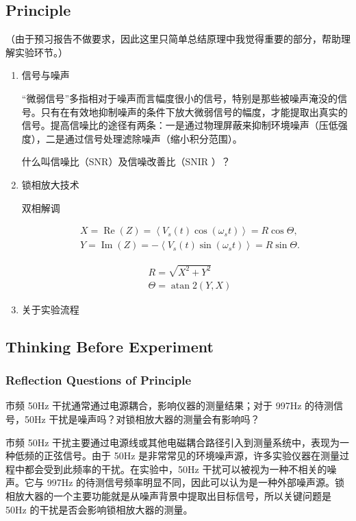 \subsection{Principle}
（由于预习报告不做要求，因此这里只简单总结原理中我觉得重要的部分，帮助理解实验环节。）
\begin{enumerate}
	\item 信号与噪声
	
	“微弱信号”多指相对于噪声而言幅度很小的信号，特别是那些被噪声淹没的信号。只有在有效地抑制噪声的条件下放大微弱信号的幅度，才能提取出真实的信号。提高信噪比的途径有两条：一是通过物理屏蔽来抑制环境噪声（压低强度），二是通过信号处理滤除噪声（缩小积分范围）。
	
	什么叫信噪比（SNR）及信噪改善比（SNIR ）？  
	
	\item 锁相放大技术
	
	双相解调
	
	$$
	\begin{aligned}
		& X=\operatorname{Re}(Z)=\left\langle V_s(t) \cos \left(\omega_s t\right)\right\rangle=R \cos \Theta, \\
		& Y=\operatorname{Im}(Z)=-\left\langle V_s(t) \sin \left(\omega_s t\right)\right\rangle=R \sin \Theta .
	\end{aligned}
	$$
	
	$$
	\begin{aligned}
		& R=\sqrt{X^2+Y^2} \\
		& \Theta=\operatorname{atan} 2(Y, X)
	\end{aligned}
	$$
	
	\item 关于实验流程
\end{enumerate}


\subsection{Thinking Before Experiment}

\subsubsection{Reflection Questions of Principle}

\begin{question}
	市频 50Hz 干扰通常通过电源耦合，影响仪器的测量结果；对于 997Hz 的待测信号，50Hz 干扰是噪声吗？对锁相放大器的测量会有影响吗？
\end{question}
市频 50Hz 干扰主要通过电源线或其他电磁耦合路径引入到测量系统中，表现为一种低频的正弦信号。由于 50Hz 是非常常见的环境噪声源，许多实验仪器在测量过程中都会受到此频率的干扰。在实验中，50Hz 干扰可以被视为一种不相关的噪声。它与 997Hz 的待测信号频率明显不同，因此可以认为是一种外部噪声源。锁相放大器的一个主要功能就是从噪声背景中提取出目标信号，所以关键问题是 50Hz 的干扰是否会影响锁相放大器的测量。

